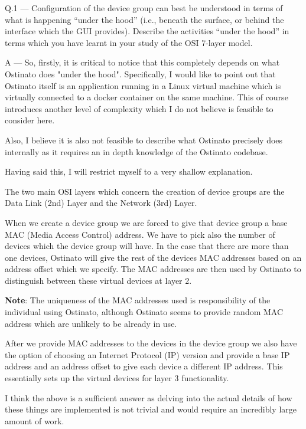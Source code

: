 \documentclass{article}
\begin{document}
\newcommand\Que[2]{%
   \begin{samepage}
   \leavevmode\par
   \noindent
   Q.#1 --- #2\par
   \end{samepage}}

\newcommand\Ans[2][]{%
   \begin{samepage}
    \leavevmode\par\noindent
   {\leftskip37pt
    A --- \textbf{#1}#2\par}
   \end{samepage}}

\Que{1}{Configuration of the device group can best be understood
   in terms of what is happening ``under the hood'' (i.e.,
   beneath the surface, or behind the interface which the GUI
   provides). Describe the activities ``under the hood'' in
terms which you have learnt in your study of the OSI 7-layer
model.}
\Ans{
So, firstly, it is critical to notice that this completely
depends on what Ostinato does "under the hood". Specifically, I
would like to point out that Ostinato itself is an application
running in a Linux virtual machine which is virtually connected
to a docker container on the same machine. This of course
introduces another level of complexity which I do not believe is
feasible to consider here.

Also, I believe it is also not feasible to describe what
Ostinato precisely does internally as it requires an in depth
knowledge of the Ostinato codebase.

Having said this, I will restrict myself to a very shallow
explanation.

The two main OSI layers which concern the creation of device
groups are the Data Link (2nd) Layer and the Network (3rd)
Layer.

When we create a device group we are forced to give that device
group a base MAC (Media Access Control) address. We have to pick
also the number of devices which the device group will have. In
the case that there are more than one devices, Ostinato will
give the rest of the devices MAC addresses based on an address
offset which we specify. The MAC addresses are then used by
Ostinato to distinguish between these virtual devices at layer
2.

\begin{displayquote}
\textbf{Note}: The uniqueness of the MAC addresses used is
responsibility of the individual using Ostinato, although
Ostinato seems to provide random MAC address which are unlikely
to be already in use.
\end{displayquote}

After we provide MAC addresses to the devices in the device
group we also have the option of choosing an Internet Protocol
(IP) version and provide a base IP address and an address offset
to give each device a different IP address. This essentially
sets up the virtual devices for layer 3 functionality.

I think the above is a sufficient answer as delving into the
actual details of how these things are implemented is not
trivial and would require an incredibly large amount of work.
}
\end{document}
